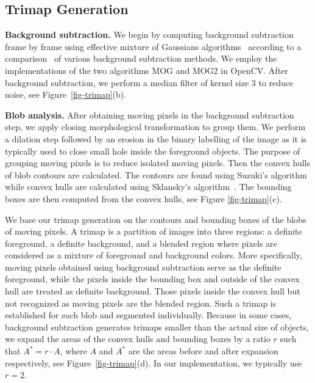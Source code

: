 \subsection{Trimap Generation}
\label{method-tg}

\textbf{Background subtraction.}
We begin by computing background subtraction frame by frame using effective  mixture of Gaussians algorithms~\cite{kaewtrakulpong2002,zivkovic2004} according to a comparison~\cite{sobral2014} of various background subtraction methods. We employ the implementations of the two algorithms MOG and MOG2 in OpenCV. After background subtraction, we perform a median filter of kernel size 3 to reduce noise, see Figure~\ref{fig-trimap}(b).

\textbf{Blob analysis.}
After obtaining moving pixels in the background subtraction step, we apply closing morphological transformation to group them. We perform a dilation step followed by an erosion in the binary labelling of the image as it is typically used to close small hole inside the foreground objects.
The purpose of grouping moving pixels is to reduce isolated moving pixels.
Then the convex hulls of blob contours are calculated. The contours are found using Suzuki's algorithm~\cite{suzuki1985} while convex hulls are calculated using Sklansky's algorithm~\cite{sklansky1982}. The bounding boxes are then computed from the convex hulls, see Figure \ref{fig-trimap}(c).

We base our trimap generation on the contours and bounding boxes of the blobs of moving pixels.
A trimap is a partition of images into three regions: a definite foreground, a definite background, and a blended region where pixels are considered as a mixture of foreground and background colors.
More specifically, moving pixels obtained using background subtraction serve as the definite foreground, while the pixels inside the bounding box and outside of the convex hull are treated as definite background.
Those pixels inside the convex hull but not recognized as moving pixels are the blended region.
Such a trimap is established for each blob and segmented individually.
Because in some cases, background subtraction generates trimaps smaller than the actual size of objects, we expand the areas of the convex hulls and bounding boxes by a ratio $r$ such that $A^{*}=r\cdot A$, where $A$ and $A^{*}$ are the areas before and after expansion respectively, see Figure~\ref{fig-trimap}(d).  In our implementation, we typically use $r=2$.

